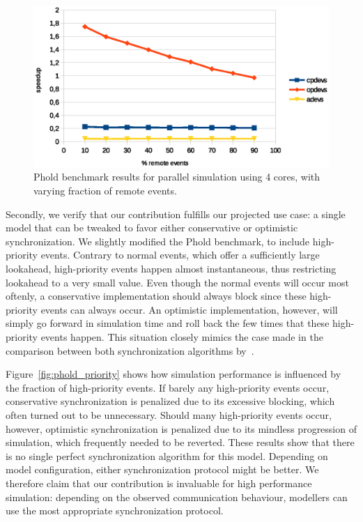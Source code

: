 \begin{figure}
    \includegraphics[width=\columnwidth]{fig/phold_remotes.eps}
    \caption{Phold benchmark results for parallel simulation using 4 cores, with varying fraction of remote events.}
\end{figure}

Secondly, we verify that our contribution fulfills our projected use case: a single model that can be tweaked to favor either conservative or optimistic synchronization.
We slightly modified the Phold benchmark, to include high-priority events.
Contrary to normal events, which offer a sufficiently large lookahead, high-priority events happen almost instantaneous, thus restricting lookahead to a very small value.
Even though the normal events will occur most oftenly, a conservative implementation should always block since these high-priority events can always occur.
An optimistic implementation, however, will simply go forward in simulation time and roll back the few times that these high-priority events happen.
This situation closely mimics the case made in the comparison between both synchronization algorithms by~\cite{FujimotoBook}.

Figure~\ref{fig:phold_priority} shows how simulation performance is influenced by the fraction of high-priority events.
If barely any high-priority events occur, conservative synchronization is penalized due to its excessive blocking, which often turned out to be unnecessary.
Should many high-priority events occur, however, optimistic synchronization is penalized due to its mindless progression of simulation, which frequently needed to be reverted.
These results show that there is no single perfect synchronization algorithm for this model.
Depending on model configuration, either synchronization protocol might be better.
We therefore claim that our contribution is invaluable for high performance simulation: depending on the observed communication behaviour, modellers can use the most appropriate synchronization protocol.

